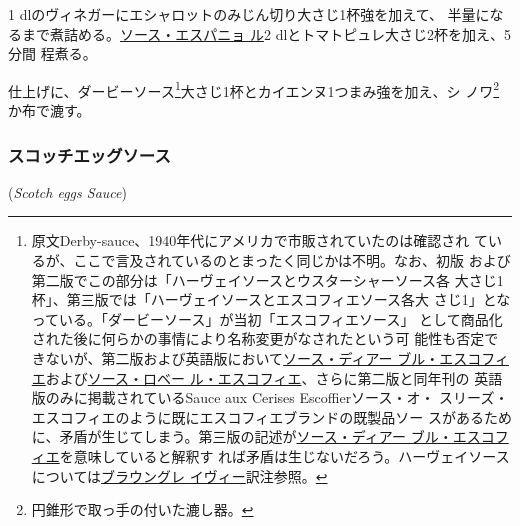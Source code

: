 \begin{recette}
1\undemi{} dlのヴィネガーにエシャロットのみじん切り大さじ1杯強を加えて、
半量になるまで煮詰める。\protect\hyperlink{sauce-espagnole}{ソース・エスパニョ
ル}2\undemi{} dlとトマトピュレ大さじ2杯を加え、5分間 程煮る。

仕上げに、ダービーソース\footnote{原文Derby-sauce、1940年代にアメリカで市販されていたのは確認され
  ているが、ここで言及されているのとまったく同じかは不明。なお、初版
  および第二版でこの部分は「ハーヴェイソースとウスターシャーソース各
  大さじ1杯」、第三版では「ハーヴェイソースとエスコフィエソース各大
  さじ1」となっている。「ダービーソース」が当初「エスコフィエソース」
  として商品化された後に何らかの事情により名称変更がなされたという可
  能性も否定できないが、第二版および英語版において\protect\hyperlink{sauce-diable-escoffier}{ソース・ディアー
  ブル・エスコフィエ}および\protect\hyperlink{sauce-robert-escoffier}{ソース・ロベー
  ル・エスコフィエ}、さらに第二版と同年刊の
  英語版のみに掲載されているSauce aux Cerises Escoffierソース・オ・
  スリーズ・エスコフィエのように既にエスコフィエブランドの既製品ソー
  スがあるために、矛盾が生じてしまう。第三版の記述が\protect\hyperlink{sauce-diable-escoffier}{ソース・ディアー
  ブル・エスコフィエ}を意味していると解釈す
  れば矛盾は生じないだろう。ハーヴェイソースについては\protect\hyperlink{brown-gravy}{ブラウングレ
  イヴィー}訳注参照。}大さじ1杯とカイエンヌ1つまみ強を加え、シ
ノワ\footnote{円錐形で取っ手の付いた漉し器。}か布で漉す。

\maeaki

\hypertarget{scotch-eggs-sauce}{%
\subsubsection{スコッチエッグソース}\label{scotch-eggs-sauce}}

\hspace{1em}(\emph{Scotch eggs Sauce})



\end{recette}
